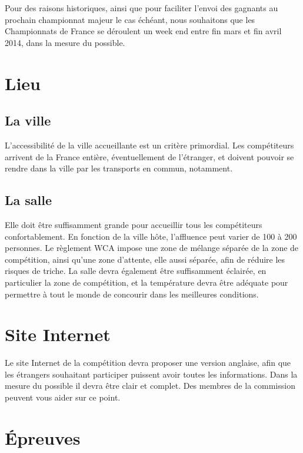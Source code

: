 \documentclass[a4paper,12pt]{scrartcl}
\begin{document}
Pour des raisons historiques, ainsi que pour faciliter l’envoi des gagnants au prochain championnat majeur le cas échéant, nous souhaitons que les Championnats de France se déroulent un week end entre fin mars et fin avril 2014, dans la mesure du possible.



\pagebreak

\section*{Lieu}


\subsection*{La ville}

L’accessibilité de la ville accueillante est un critère primordial. Les compétiteurs arrivent de la France entière, éventuellement de l’étranger, et doivent pouvoir se rendre dans la ville par les transports en commun, notamment.


\subsection*{La salle}
Elle doit être suffisamment grande pour accueillir tous les compétiteurs confortablement. En fonction de la ville hôte, l’affluence peut varier de 100 à 200 personnes. 
Le règlement WCA impose une zone de mélange séparée de la zone de compétition, ainsi qu’une zone d’attente, elle aussi séparée, afin de réduire les risques de triche.
La salle devra également être suffisamment éclairée, en particulier la zone de compétition, et la température devra être adéquate pour permettre à tout le monde de concourir dans les meilleures conditions.


\section*{Site Internet}


Le site Internet de la compétition devra proposer une version anglaise, afin que les étrangers souhaitant participer puissent avoir toutes les informations. Dans la mesure du possible il devra être clair et complet. Des membres de la commission peuvent vous aider sur ce point.




\section*{Épreuves}
\end{document}

